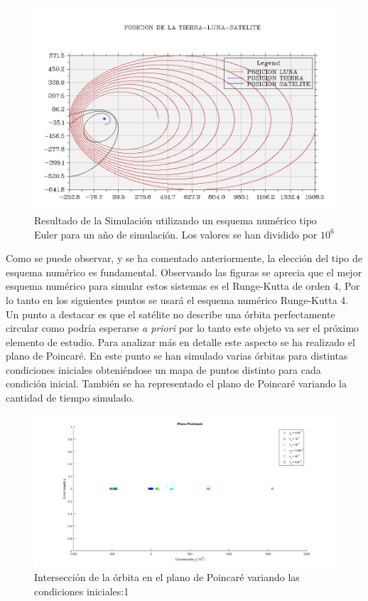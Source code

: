 \documentclass[11pt,singlespacing,liststotoc,headsepline,a4paper]{article}
\begin{document}
\begin{figure}[H]
	\centering
	\includegraphics[width=1\textwidth]{TLS1A_EU.jpg}
	\caption{Resultado de la Simulación utilizando un esquema numérico tipo Euler para un año de simulación.  Los valores se han dividido por $10^{6}$}
	\label{TLS1A_EU}
\end{figure}

Como se puede observar, y se ha comentado anteriormente, la elección del tipo de esquema numérico es fundamental. Observando las figuras se aprecia que el mejor esquema numérico para simular estos sistemas es el Runge-Kutta de orden 4, Por lo tanto en los siguientes puntos se usará el esquema numérico Runge-Kutta 4. Un punto a destacar es que el satélite no describe una órbita perfectamente circular como podría esperarse \textit{a priori} por lo tanto este objeto va ser el próximo elemento de estudio. Para analizar más en detalle este aspecto se ha realizado el plano de Poincaré. En este punto se han simulado varias órbitas para distintas condiciones iniciales obteniéndose un mapa de puntos distinto para cada condición inicial. También se ha representado el plano de Poincaré variando la cantidad de tiempo simulado.

\begin{figure}[H]
	\centering
	\includegraphics[width=1\textwidth]{PointCareCI_1.png}
	\caption{Intersección de la órbita en el plano de Poincaré variando las condiciones iniciales:1}
	\label{PointCareCI_1}
\end{figure}
\end{document}
